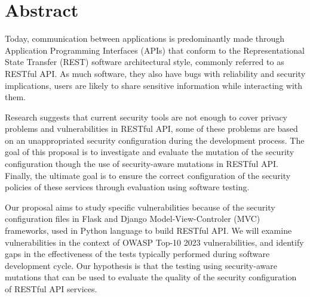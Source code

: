 \chapter*{Abstract}

Today, communication between applications is predominantly made through Application Programming Interfaces (APIs) that conform to the Representational State Transfer (REST) software architectural style, commonly referred to as RESTful API. As much software, they also have bugs with reliability and security implications, 
users are likely to share sensitive information while interacting with them.

Research suggests that current security tools are not enough to cover privacy problems and vulnerabilities in RESTful API, some of these problems are based on an unappropriated security configuration during the development process.
The goal of this proposal is to investigate and evaluate the mutation of the security configuration though the use of security-aware mutations in RESTful API. Finally, the ultimate goal is to ensure the correct configuration of the security policies of these services through evaluation using software testing.


Our proposal aims to study specific vulnerabilities because of the security configuration files in Flask and Django Model-View-Controler (MVC) frameworks, used in Python language to build RESTful API. We will examine vulnerabilities in the context of OWASP Top-10 2023 vulnerabilities, and identify gaps in the effectiveness of the tests typically performed during software development cycle.
Our hypothesis is that the testing using security-aware mutations that can be used to evaluate the quality of the security configuration of RESTful API services.
